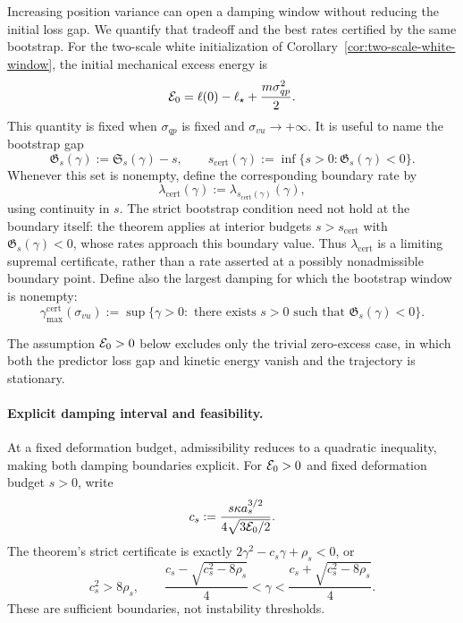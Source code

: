 Increasing position variance can open a damping window without reducing
the initial loss gap. We quantify that tradeoff and the best rates
certified by the same bootstrap.
For the two-scale white initialization of
Corollary~\ref{cor:two-scale-white-window}, the initial mechanical excess
energy is
\[
\mathcal E_0
=
\ell(0)-\ell_\star+\frac{m\sigma_{qp}^2}{2}.
\]
This quantity is fixed when \(\sigma_{qp}\) is fixed and
\(\sigma_{vu}\to+\infty\).  It is useful to name the bootstrap gap
\[
\mathfrak G_s(\gamma):=\mathfrak S_s(\gamma)-s,
\qquad
s_{\mathrm{cert}}(\gamma)
:=
\inf\{s>0:\mathfrak G_s(\gamma)<0\}.
\]
Whenever this set is nonempty, define the corresponding boundary rate by
\[
\lambda_{\mathrm{cert}}(\gamma)
:=
\lambda_{s_{\mathrm{cert}}(\gamma)}(\gamma),
\]
using continuity in \(s\).  The strict bootstrap condition need not hold at
the boundary itself: the theorem applies at interior budgets
\(s>s_{\mathrm{cert}}\) with \(\mathfrak G_s(\gamma)<0\), whose rates approach
this boundary value.  Thus \(\lambda_{\mathrm{cert}}\) is a limiting supremal
certificate, rather than a rate asserted at a possibly nonadmissible boundary
point.
Define also the largest damping for which the bootstrap window is nonempty:
\[
\gamma^{\mathrm{cert}}_{\max}(\sigma_{vu})
:=
\sup\{\gamma>0:\text{ there exists }s>0
\text{ such that }\mathfrak G_s(\gamma)<0\}.
\]

The assumption \(\mathcal E_0>0\) below excludes only the trivial zero-excess
case, in which both the predictor loss gap and kinetic energy vanish and the
trajectory is stationary.

\paragraph{Explicit damping interval and feasibility.}
At a fixed deformation budget, admissibility reduces to a quadratic
inequality, making both damping boundaries explicit.
For \(\mathcal E_0>0\) and fixed deformation budget \(s>0\), write
\begin{equation}\label{eq:window}
 c_s:=\frac{s\kappa a_s^{3/2}}{4\sqrt{3\mathcal E_0/2}}.
\end{equation}
The theorem's strict certificate is exactly
\(2\gamma^2-c_s\gamma+\rho_s<0\), or
\begin{equation}\label{eq:window-roots}
 c_s^2>8\rho_s,\qquad
 \frac{c_s-\sqrt{c_s^2-8\rho_s}}4<\gamma<
 \frac{c_s+\sqrt{c_s^2-8\rho_s}}4.
\end{equation}
These are sufficient boundaries, not instability thresholds.


